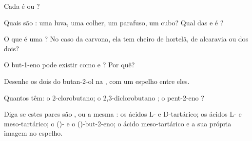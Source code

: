 \begin{exercise}[$\star$]\label{exo:g12:stereochemistry:2}
Cada  é  ou ?
\begin{center}
 \qquad
{}
\end{center}
\end{exercise}

\begin{exercise}[$\star$]\label{exo:g12:stereochemistry:3}
Quais são : uma luva, uma colher, um parafuso, um cubo? Qual das
  e  é ?
\end{exercise}

\begin{exercise}[$\star$]\label{exo:g12:stereochemistry:4}
O que é uma ? No caso da carvona, ela tem cheiro de
hortelã, de alcaravia ou dos dois?
\end{exercise}

\begin{exercise}[$\star$]\label{exo:g12:stereochemistry:5}
O but-1-eno  pode existir como  e ? Por
quê?
\end{exercise}

\begin{exercise}[$\star\star$]\label{exo:g12:stereochemistry:6}
Desenhe os dois  do butan-2-ol na , com
um espelho entre eles.
\end{exercise}

\begin{exercise}[$\star\star$]\label{exo:g12:stereochemistry:7}
Quantos  têm: o 2-clorobutano; o 2,3-diclorobutano
; o pent-2-eno ?
\end{exercise}

\begin{exercise}[$\star\star$]\label{exo:g12:stereochemistry:8}
Diga se estes pares são ,  ou a mesma
: os ácidos L- e D-tartárico; os ácidos L- e meso-tartárico; o
()- e o ()-but-2-eno; o ácido meso-tartárico e a sua própria imagem no
espelho.
\end{exercise}

